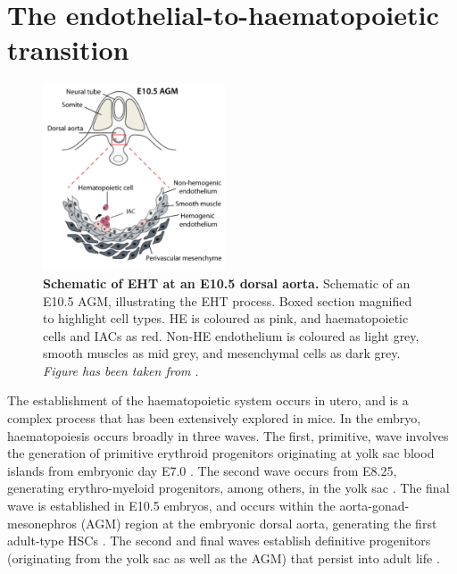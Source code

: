 

\section{\label{ch1:eht}The endothelial-to-haematopoietic transition}

\begin{figure}
  \begin{center}
    \includegraphics[width=0.48\textwidth]{figures/chapter1/ch1_swiers.png}
  \end{center}
  \caption[{Schematic of EHT at an E10.5 dorsal aorta.}]
    {\textbf{Schematic of EHT at an E10.5 dorsal aorta.} 
    Schematic of an E10.5 AGM, illustrating the EHT process. Boxed section magnified to highlight cell types. HE is coloured as pink, and haematopoietic cells and IACs as red. Non-HE endothelium is coloured as light grey, smooth muscles as mid grey, and mesenchymal cells as dark grey.
    \textit{Figure has been taken from \cite{swiers_short_2013}}.
    }
    \label{fig:ch1_swiers}
\end{figure}

The establishment of the haematopoietic system occurs in utero, and is a complex process that has been extensively explored in mice. In the embryo, haematopoiesis occurs broadly in three waves. The first, primitive, wave involves the generation of primitive erythroid progenitors originating at yolk sac blood islands from embryonic day E7.0 \citep{palis_development_1999, palis_yolk-sac_2001}. The second wave occurs from E8.25, generating erythro-myeloid progenitors, among others, in the yolk sac \citep{palis_development_1999, frame_erythro-myeloid_2013}. The final wave is established in E10.5 embryos, and occurs within the aorta-gonad-mesonephros (AGM) region at the embryonic dorsal aorta, generating the first adult-type HSCs \citep{medvinsky_definitive_1996, muller_development_1994, de_bruijn_definitive_2000}. The second and final waves establish definitive progenitors (originating from the yolk sac as well as the AGM) that persist into adult life \citep{yoshimoto_autonomous_2012, yoshimoto_embryonic_2011, gomez_perdiguero_tissue-resident_2015, gentek_hemogenic_2018}.

